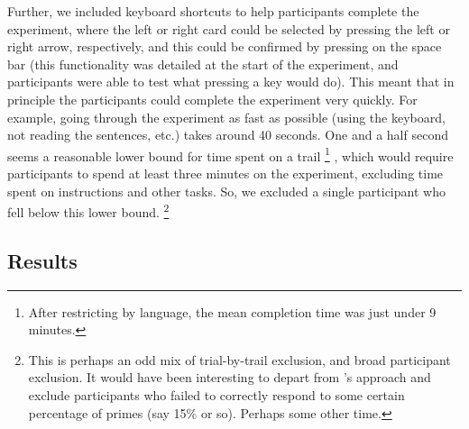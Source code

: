 \documentclass[10pt]{article}
\begin{document}
\begin{multicols}{2}
Further, we included keyboard shortcuts to help participants complete the experiment, where the left or right card could be selected by pressing the left or right arrow, respectively, and this could be confirmed by pressing on the space bar (this functionality was detailed at the start of the experiment, and participants were able to test what pressing a key would do).
  This meant that in principle the participants could complete the experiment very quickly.
  For example, going through the experiment as fast as possible (using the keyboard, not reading the sentences, etc.) takes around 40 seconds.
  One and a half second seems a reasonable lower bound for time spent on a trail\nolinebreak
  \footnote{After restricting by language, the mean completion time was just under 9 minutes.}\nolinebreak
  , which would require participants to spend at least three minutes on the experiment, excluding time spent on instructions and other tasks.
  So, we excluded a single participant who fell below this lower bound.\nolinebreak
  \footnote{This is perhaps an odd mix of trial-by-trail exclusion, and broad participant exclusion.
    It would have been interesting to depart from \citeauthor{Bott:2016aa}'s approach and exclude participants who failed to correctly respond to some certain percentage of primes (say 15\% or so).
  Perhaps some other time.}


\subsection{Results}
\label{sec:results}


\end{multicols}
\end{document}
